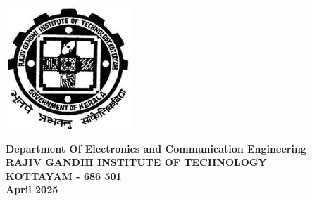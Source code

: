 \begin{center}
    \includegraphics {clg_logo.jpg}

    \vspace{30pt}

    {
        \large \bfseries
        Department Of Electronics and Communication Engineering \\
        \vspace{5pt}
        RAJIV GANDHI INSTITUTE OF TECHNOLOGY \\
        \vspace{5pt}
        KOTTAYAM - 686 501 \\
        \vspace{5pt}
        April 2025 \\
        \vspace{5pt}
    }


\end{center}


\pagebreak

